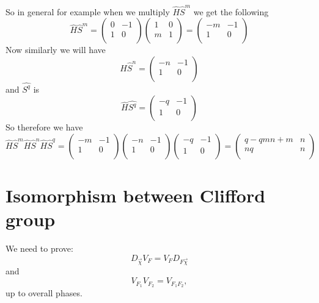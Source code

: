 \documentclass{article}
\begin{document}
So in general for example when we multiply $\hat{H}\hat{S}^{m}$ we get the following 
\[\hat{H}\hat{S}^{m}=
\begin{pmatrix}
0 & -1\\
1 & 0\\
\end{pmatrix}
\begin{pmatrix}
1 & 0\\
m & 1\\
\end{pmatrix}
=
\begin{pmatrix}
-m & -1\\
1 & 0\\
\end{pmatrix}
\]
Now similarly we will have 
\[
\hat{H}\hat{S}^{n}= 
\begin{pmatrix}
-n & -1\\
1 & 0\\
\end{pmatrix}
\]
and $\hat{S^{q}}$ is 
\[
\hat{H}\hat{S^{q}}=
\begin{pmatrix}
-q & -1\\
1 & 0\\
\end{pmatrix}
\]
So therefore we have 
\[
\hat{H}\hat{S}^{m}\hat{H}\hat{S}^{n}\hat{H}\hat{S}^{q}=
\begin{pmatrix}
-m & -1\\
1 & 0\\
\end{pmatrix}
\begin{pmatrix}
-n & -1\\
1 & 0\\
\end{pmatrix}
\begin{pmatrix}
-q & -1\\
1 & 0\\
\end{pmatrix}
=
\begin{pmatrix}
q-qmn+m & n\\
nq & n\\
\end{pmatrix}
\]

\section{Isomorphism between Clifford group}
We need to prove:
\begin{equation}
 D_{\vec{\chi}} V_F= V_F D_{F {\vec{\chi}}}
\end{equation}
and 
\begin{equation}
    V_{F_1} V_{F_2}=V_{F_1 F_2},
\end{equation}
up to overall phases.
\end{document}
